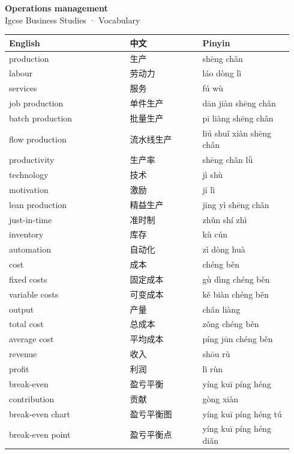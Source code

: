\documentclass[11pt]{article}
\begin{document}
\begin{center}
  {\LARGE\bfseries Operations management}\\[0.35em]
  {\large Igcse Business Studies · Vocabulary}
\end{center}
\vspace{0.6em}

\begin{longtable}{@{}p{0.40\linewidth}p{0.24\linewidth}p{0.30\linewidth}@{}}
\toprule
\textbf{English} & \textbf{中文} & \textbf{Pinyin} \\
\midrule
\endhead
\bottomrule
\endlastfoot
production & 生产 & shēng chǎn \\
labour & 劳动力 & láo dòng lì \\
services & 服务 & fú wù \\
job production & 单件生产 & dān jiàn shēng chǎn \\
batch production & 批量生产 & pī liàng shēng chǎn \\
flow production & 流水线生产 & liú shuǐ xiàn shēng chǎn \\
productivity & 生产率 & shēng chǎn lǜ \\
technology & 技术 & jì shù \\
motivation & 激励 & jī lì \\
lean production & 精益生产 & jīng yì shēng chǎn \\
just-in-time & 准时制 & zhǔn shí zhì \\
inventory & 库存 & kù cún \\
automation & 自动化 & zì dòng huà \\
cost & 成本 & chéng běn \\
fixed costs & 固定成本 & gù dìng chéng běn \\
variable costs & 可变成本 & kě biàn chéng běn \\
output & 产量 & chǎn liàng \\
total cost & 总成本 & zǒng chéng běn \\
average cost & 平均成本 & píng jūn chéng běn \\
revenue & 收入 & shōu rù \\
profit & 利润 & lì rùn \\
break-even & 盈亏平衡 & yíng kuī píng héng \\
contribution & 贡献 & gòng xiàn \\
break-even chart & 盈亏平衡图 & yíng kuī píng héng tú \\
break-even point & 盈亏平衡点 & yíng kuī píng héng diǎn \\

\end{longtable}
\end{document}

